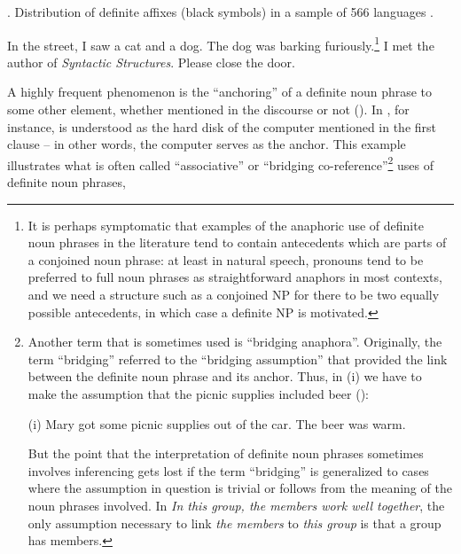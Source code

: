 
. Distribution of definite affixes (black symbols) in a sample of 566 languages \citep{Dryer2005}.


\ea 
	\gl	\label{bkm:Ref93745057}In the street, I saw a cat and a dog. The dog was barking furiously.\footnote{ It is perhaps symptomatic that examples of the anaphoric use of definite noun phrases in the literature tend to contain antecedents which are parts of a conjoined noun phrase: at least in natural speech, pronouns tend to be preferred to full noun phrases as straightforward anaphors in most contexts, and we need a structure such as a conjoined NP for there to be two equally possible antecedents, in which case a definite NP is motivated.}
\z 
\ea 
	\gl	\label{bkm:Ref93745078}I met the author of \textit{Syntactic Structures}.
\z 
\ea 
	\gl \label{bkm:Ref93745091}Please close the door. 
\z 

A highly frequent phenomenon is the “anchoring” of a definite noun phrase to some other element, whether mentioned in the discourse or not (\citet[25]{Fraurud1992}). In , for instance,  is understood as the hard disk of the computer mentioned in the first clause – in other words, the computer serves as the anchor.  This example illustrates what is often called “associative” or “bridging co-reference”\footnote{ Another term that is sometimes used is “bridging anaphora”. Originally, the term “bridging” referred to the “bridging assumption” that provided the link between the definite noun phrase and its anchor. Thus, in (i) we have to make the assumption that the picnic supplies included beer (\citet{ClarkEtAl1974}):\par (i) Mary got some picnic supplies out of the car. The beer was warm. \par But the point that the interpretation of definite noun phrases sometimes involves inferencing gets lost if the term “bridging” is generalized to cases where the assumption in question is trivial or follows from the meaning of the noun phrases involved. In \textit{In this group, the members work well together}, the only assumption necessary to link \textit{the members} to \textit{this group} is that a group has members. } uses of definite noun phrases,

